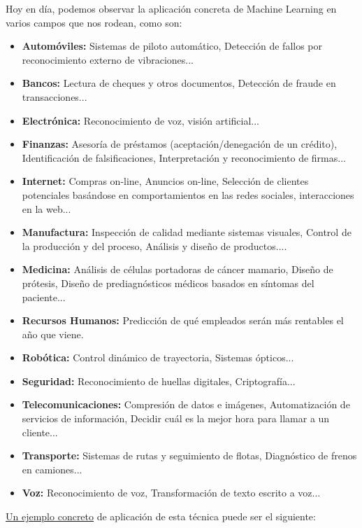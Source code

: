 \documentclass[a4paper, 11pt]{article} %
\begin{document}
Hoy en día, podemos observar la aplicación concreta de Machine Learning en varios campos que nos rodean, como son:
		\begin{itemize}
		    \item \textbf{Automóviles:} Sistemas de piloto automático, Detección de fallos por reconocimiento externo de vibraciones...
		    \item \textbf{Bancos:} Lectura de cheques y otros documentos, Detección de fraude en transacciones...
		    \item \textbf{Electrónica:} Reconocimiento de voz, visión artificial...
		    \item \textbf{Finanzas:} Asesoría de préstamos (aceptación/denegación de un crédito), Identificación de falsificaciones, Interpretación y reconocimiento de firmas...
		    \item \textbf{Internet:} Compras on-line, Anuncios on-line, Selección de clientes potenciales basándose en comportamientos en las redes sociales, interacciones en la web...
		    \item \textbf{Manufactura:}  Inspección de calidad mediante sistemas visuales, Control de la producción y del proceso, Análisis y diseño de productos....
		    \item \textbf{Medicina:} Análisis de células portadoras de cáncer mamario, Diseño de prótesis, Diseño de prediagnósticos médicos basados en síntomas del paciente...
		    \item \textbf{Recursos Humanos:} Predicción de qué empleados serán más rentables el año que viene.
		    \item \textbf{Robótica:} Control dinámico de trayectoria, Sistemas ópticos...
		    \item \textbf{Seguridad:} Reconocimiento de huellas digitales, Criptografía...		\item \textbf{Telecomunicaciones:} Compresión de datos e imágenes, Automatización de servicios de información, Decidir cuál es la mejor hora para llamar a un cliente...
		    \item \textbf{Transporte:} Sistemas de rutas y seguimiento de flotas, Diagnóstico de frenos en camiones...
		    \item \textbf{Voz:} Reconocimiento de voz, Transformación de texto escrito a voz...
		\end{itemize}

\underline{Un ejemplo concreto} de aplicación de esta técnica puede ser el siguiente:
\end{document}
